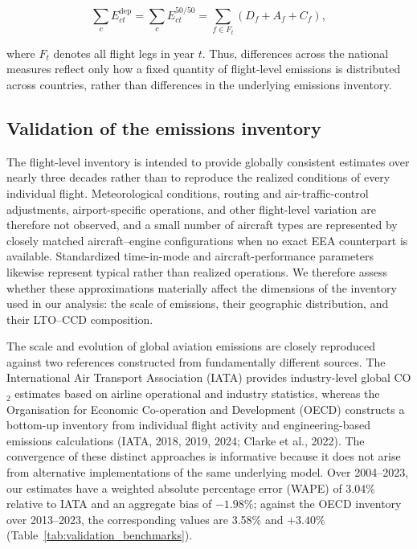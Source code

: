 \documentclass[12pt]{article}
\begin{document}
\begin{equation}
\sum_c E^{\mathrm{dep}}_{ct}
=
\sum_c E^{50/50}_{ct}
=
\sum_{f\in F_t}
\left(D_f+A_f+C_f\right),
\label{eq:nature_8}
\end{equation}

where $F_t$ denotes all flight legs in year $t$. Thus, differences across the national measures reflect only how a fixed quantity of flight-level emissions is distributed across countries, rather than differences in the underlying emissions inventory.

\subsection*{Validation of the emissions inventory}

The flight-level inventory is intended to provide globally consistent estimates over nearly three decades rather than to reproduce the realized conditions of every individual flight. Meteorological conditions, routing and air-traffic-control adjustments, airport-specific operations, and other flight-level variation are therefore not observed, and a small number of aircraft types are represented by closely matched aircraft--engine configurations when no exact EEA counterpart is available. Standardized time-in-mode and aircraft-performance parameters likewise represent typical rather than realized operations. We therefore assess whether these approximations materially affect the dimensions of the inventory used in our analysis: the scale of emissions, their geographic distribution, and their LTO--CCD composition.

The scale and evolution of global aviation emissions are closely reproduced against two references constructed from fundamentally different sources. The International Air Transport Association (IATA) provides industry-level global CO$_2$ estimates based on airline operational and industry statistics, whereas the Organisation for Economic Co-operation and Development (OECD) constructs a bottom-up inventory from individual flight activity and engineering-based emissions calculations (IATA, 2018, 2019, 2024; Clarke et al., 2022). The convergence of these distinct approaches is informative because it does not arise from alternative implementations of the same underlying model. Over 2004--2023, our estimates have a weighted absolute percentage error (WAPE) of 3.04\% relative to IATA and an aggregate bias of $-1.98\%$; against the OECD inventory over 2013--2023, the corresponding values are 3.58\% and $+3.40\%$ (Table~\ref{tab:validation_benchmarks}).
\end{document}
